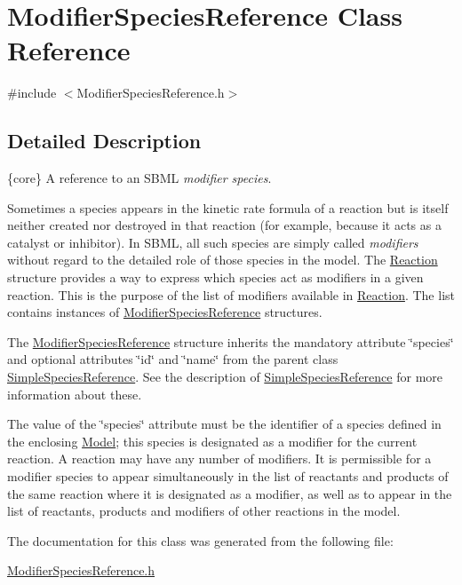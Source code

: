 \hypertarget{class_modifier_species_reference}{}\section{Modifier\+Species\+Reference Class Reference}
\label{class_modifier_species_reference}


{\ttfamily \#include $<$Modifier\+Species\+Reference.\+h$>$}



\subsection{Detailed Description}
\{core\} A reference to an S\+B\+ML {\itshape modifier species}.

Sometimes a species appears in the kinetic rate formula of a reaction but is itself neither created nor destroyed in that reaction (for example, because it acts as a catalyst or inhibitor). In S\+B\+ML, all such species are simply called {\itshape modifiers} without regard to the detailed role of those species in the model. The \hyperlink{class_reaction}{Reaction} structure provides a way to express which species act as modifiers in a given reaction. This is the purpose of the list of modifiers available in \hyperlink{class_reaction}{Reaction}. The list contains instances of \hyperlink{class_modifier_species_reference}{Modifier\+Species\+Reference} structures.

The \hyperlink{class_modifier_species_reference}{Modifier\+Species\+Reference} structure inherits the mandatory attribute \char`\"{}species\char`\"{} and optional attributes \char`\"{}id\char`\"{} and \char`\"{}name\char`\"{} from the parent class \hyperlink{class_simple_species_reference}{Simple\+Species\+Reference}. See the description of \hyperlink{class_simple_species_reference}{Simple\+Species\+Reference} for more information about these.

The value of the \char`\"{}species\char`\"{} attribute must be the identifier of a species defined in the enclosing \hyperlink{class_model}{Model}; this species is designated as a modifier for the current reaction. A reaction may have any number of modifiers. It is permissible for a modifier species to appear simultaneously in the list of reactants and products of the same reaction where it is designated as a modifier, as well as to appear in the list of reactants, products and modifiers of other reactions in the model. 

The documentation for this class was generated from the following file\+:\begin{DoxyCompactItemize}
\item 
\hyperlink{_modifier_species_reference_8h}{Modifier\+Species\+Reference.\+h}\end{DoxyCompactItemize}
